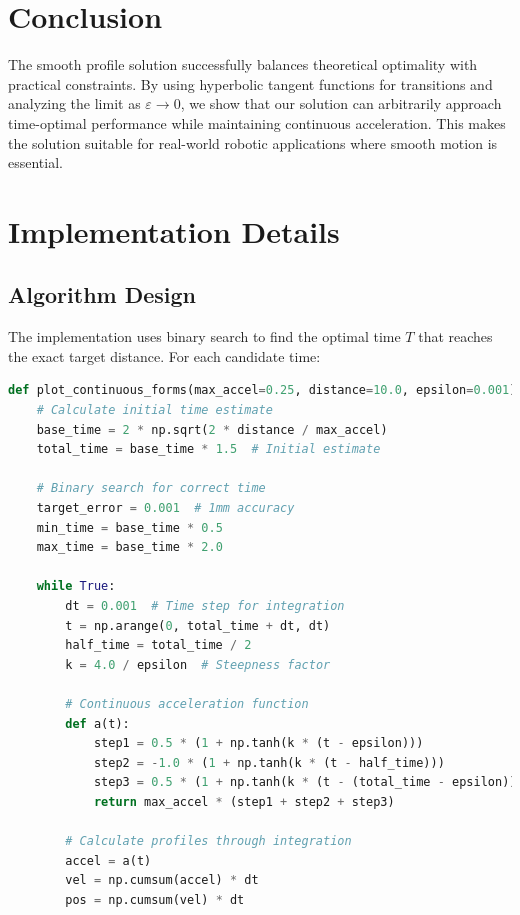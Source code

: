 \documentclass[12pt,a4paper]{article}
\begin{document}
\newpage
\section{Conclusion}
The smooth profile solution successfully balances theoretical optimality with practical constraints. By using hyperbolic tangent functions for transitions and analyzing the limit as $\varepsilon \to 0$, we show that our solution can arbitrarily approach time-optimal performance while maintaining continuous acceleration. This makes the solution suitable for real-world robotic applications where smooth motion is essential.

\clearpage
\appendix
\section{Implementation Details}
\subsection{Algorithm Design}
The implementation uses binary search to find the optimal time $T$ that reaches the exact target distance. For each candidate time:

\begin{lstlisting}[language=Python, caption=Core implementation of motion profiles]
def plot_continuous_forms(max_accel=0.25, distance=10.0, epsilon=0.001):
    # Calculate initial time estimate
    base_time = 2 * np.sqrt(2 * distance / max_accel)
    total_time = base_time * 1.5  # Initial estimate
    
    # Binary search for correct time
    target_error = 0.001  # 1mm accuracy
    min_time = base_time * 0.5
    max_time = base_time * 2.0
    
    while True:
        dt = 0.001  # Time step for integration
        t = np.arange(0, total_time + dt, dt)
        half_time = total_time / 2
        k = 4.0 / epsilon  # Steepness factor
        
        # Continuous acceleration function
        def a(t):
            step1 = 0.5 * (1 + np.tanh(k * (t - epsilon)))
            step2 = -1.0 * (1 + np.tanh(k * (t - half_time)))
            step3 = 0.5 * (1 + np.tanh(k * (t - (total_time - epsilon))))
            return max_accel * (step1 + step2 + step3)
        
        # Calculate profiles through integration
        accel = a(t)
        vel = np.cumsum(accel) * dt
        pos = np.cumsum(vel) * dt
\end{lstlisting}
\end{document}
